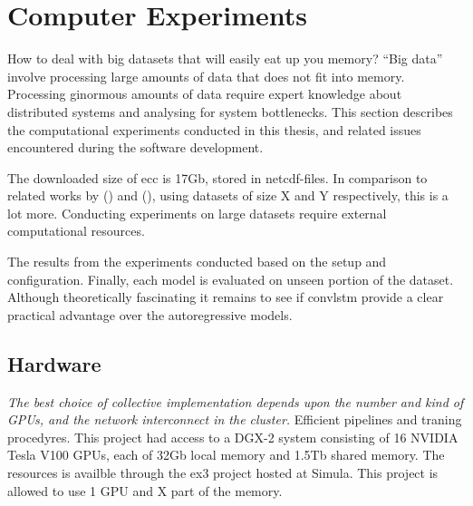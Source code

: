 \chapter{Computer Experiments} \label{ch:computer_experiments}
How to deal with big datasets that will easily eat up you memory? ``Big data'' involve processing large amounts of data that does not fit into memory. Processing ginormous amounts of data require expert knowledge about distributed systems and analysing for system bottlenecks. This section describes the computational experiments conducted in this thesis, and related issues encountered during the software development. 

The downloaded size of \acrshort{ecc} is 17Gb, stored in \acrshort{netcdf}-files. 
In comparison to related works by \citeauthor{precip_nowcasting} (\citeyear{precip_nowcasting}) and \citeauthor{SunAirLSTM} (\citeyear{SunAirLSTM}), using datasets of size X and Y respectively, this is a lot more.
Conducting experiments on large datasets require external computational resources. %

The results from the experiments conducted based on the setup and configuration. %
Finally, each model is evaluated on unseen portion of the dataset. Although theoretically fascinating it remains to see if \acrshort{convlstm} provide a clear practical advantage over the autoregressive models.

\section{Hardware}
\textit{The best choice of collective implementation depends upon the number and kind of GPUs, and the network interconnect in the cluster.} Efficient pipelines and traning procedyres. This project had access to a DGX-2 system consisting of 16 NVIDIA Tesla V100 GPUs, each of 32Gb local memory and 1.5Tb shared memory. The resources is availble through the \acrfull{ex3} project hosted at Simula. This project is allowed to use 1 GPU and X part of the memory. 


